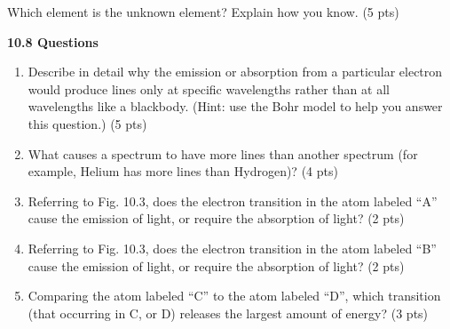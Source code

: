 \documentclass[notitlepage]{article}
\begin{document}
Which element is the unknown element? Explain how you know. (5 pts)

\vspace{5cm}

\large{\bf 10.8 Questions}
\begin{enumerate}
\item Describe in detail why the emission or absorption from a particular electron would produce lines only at specific wavelengths rather than at all wavelengths like a blackbody. (Hint: use the Bohr model to help you answer this question.) (5 pts)

\vspace{7cm}

\item What causes a spectrum to have more lines than another spectrum (for example, Helium has more lines than Hydrogen)? (4 pts)

\vspace{5cm}

\item Referring to Fig. 10.3, does the electron transition in the atom labeled ``A'' cause the emission of light, or require the absorption of light? (2 pts)

\vspace{3cm}

\item Referring to Fig. 10.3, does the electron transition in the atom labeled ``B'' cause the emission of light, or require the absorption of light? (2 pts)
 
\vspace{3cm}

\item Comparing the atom labeled ``C'' to the atom labeled ``D'', which transition (that occurring in C, or D) releases the largest amount of energy? (3 pts)



\end{enumerate}
\end{document}
